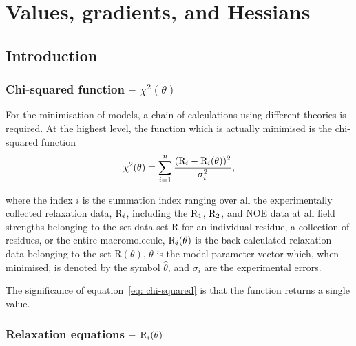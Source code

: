 
\chapter{Values, gradients, and Hessians}




\section{Introduction}


\subsection{Chi-squared function -- $\chi^2(\theta)$}

For the minimisation of models, a chain of calculations using different theories is required.  At the highest level, the function which is actually minimised is the chi-squared function
\begin{equation} \label{eq: chi-squared}
 \chi^2(\theta) = \sum_{i=1}^n \frac{(\mathrm{R}_i - \mathrm{R}_i(\theta))^2}{\sigma_i^2},
\end{equation}

\noindent where the index $i$ is the summation index ranging over all the experimentally collected relaxation data, $\mathrm{R}_i$, including the $\mathrm{R}_1$, $\mathrm{R}_2$, and NOE data at all field strengths belonging to the set data set R for an individual residue, a collection of residues, or the entire macromolecule, $\mathrm{R}_i(\theta)$ is the back calculated relaxation data belonging to the set R$(\theta)$, $\theta$ is the model parameter vector which, when minimised, is denoted by the symbol $\hat\theta$, and $\sigma_i$ are the experimental errors.

The significance of equation~\eqref{eq: chi-squared} is that the function returns a single value.


\subsection{Relaxation equations -- $\mathrm{R}_i(\theta)$}

